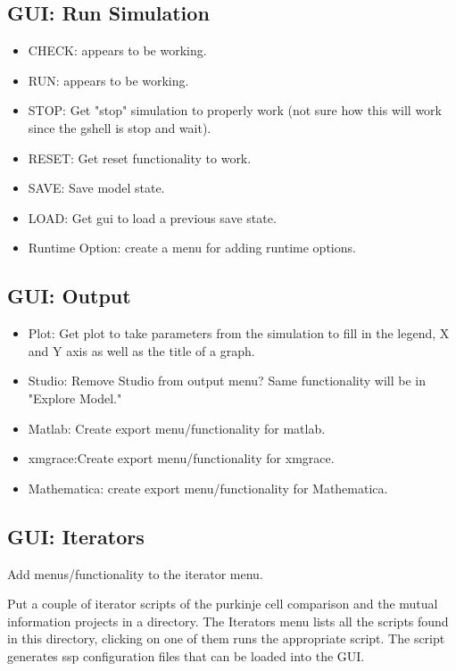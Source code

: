 \documentclass[12pt]{article}
\begin{document}
\subsection{GUI: Run Simulation}
\begin{itemize}
\item CHECK: appears to be working.
\item RUN: appears to be working.      
\item STOP: Get "stop" simulation to properly work (not sure how this
  will work since the gshell is stop and wait).
\item RESET: Get reset functionality to work.
\item SAVE: Save model state.
\item LOAD: Get gui to load a previous save state.
\item Runtime Option: create a menu for adding runtime options.
\end{itemize}

\subsection{GUI: Output}
\begin{itemize}
\item Plot: Get plot to take parameters from the simulation to fill in
  the legend, X and Y axis as well as the title of a graph.
\item Studio: Remove Studio from output menu? Same functionality will be in "Explore Model."
\item Matlab: Create export menu/functionality for matlab.
\item xmgrace:Create export menu/functionality for xmgrace.
\item Mathematica: create export menu/functionality for Mathematica.
\end{itemize}


\subsection{GUI: Iterators}
Add menus/functionality to the iterator menu.

Put a couple of iterator scripts of the purkinje cell comparison and
the mutual information projects in a directory.  The Iterators menu
lists all the scripts found in this directory, clicking on one of them
runs the appropriate script.  The script generates ssp configuration
files that can be loaded into the GUI.
\end{document}
